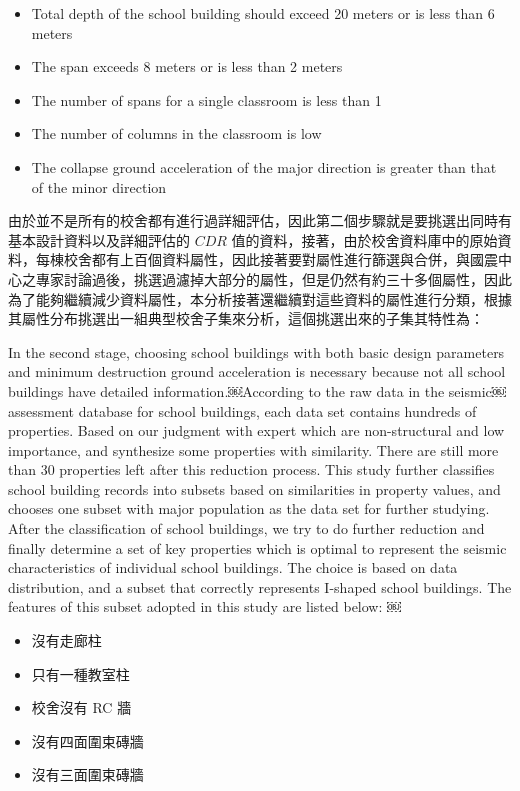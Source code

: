 \begin{itemize}
\item Total depth of the school building should exceed 20 meters or is less than 6 meters
\item The span exceeds 8 meters or is less than 2 meters
\item The number of spans for a single classroom is less than 1
\item The number of columns in the classroom is low
\item The collapse ground acceleration of the major direction is greater than that of the minor direction
\end{itemize}

由於並不是所有的校舍都有進行過詳細評估，因此第二個步驟就是要挑選出同時有基本設計資料以及詳細評估的 $CDR$ 值的資料，接著，由於校舍資料庫中的原始資料，每棟校舍都有上百個資料屬性，因此接著要對屬性進行篩選與合併，與國震中心之專家討論過後，挑選過濾掉大部分的屬性，但是仍然有約三十多個屬性，因此為了能夠繼續減少資料屬性，本分析接著還繼續對這些資料的屬性進行分類，根據其屬性分布挑選出一組典型校舍子集來分析，這個挑選出來的子集其特性為：

In the second stage, choosing school buildings with both basic design parameters and minimum destruction ground acceleration is necessary because not all school buildings have detailed information.￼According to the raw data in the seismic￼assessment database for school buildings, each data set contains hundreds of properties. Based on our judgment with expert which are non-structural and low importance, and synthesize some properties with similarity. There are still more than 30 properties left after this reduction process. This study further classifies school building records into subsets based on similarities in property values, and chooses one subset with major population as the data set for further studying. After the classification of school buildings, we try to do further reduction and finally determine a set of key properties which is optimal to represent the seismic characteristics of individual school buildings. The choice is based on data distribution, and a subset that correctly represents I-shaped school buildings. The features of this subset adopted in this study are listed below:
￼
\begin{itemize}
\item 沒有走廊柱
\item 只有一種教室柱
\item 校舍沒有 RC 牆
\item 沒有四面圍束磚牆
\item 沒有三面圍束磚牆
\end{itemize}

